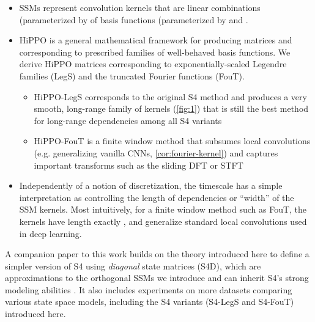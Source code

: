 \documentclass{article}
\begin{document}
\begin{itemize}\item SSMs represent convolution kernels that are linear combinations (parameterized by  of basis functions (parameterized by  and .
  \item HiPPO is a general mathematical framework for producing matrices  and  corresponding to prescribed families of well-behaved basis functions. We derive HiPPO matrices corresponding to exponentially-scaled Legendre families (LegS) and the truncated Fourier functions (FouT).
    \begin{itemize}\item HiPPO-LegS corresponds to the original S4 method and produces a very smooth, long-range family of kernels (\cref{fig:1}) that is still the best method for long-range dependencies among all S4 variants
      \item HiPPO-FouT is a finite window method that subsumes local convolutions (e.g. generalizing vanilla CNNs, \cref{cor:fourier-kernel}) and captures important transforms such as the sliding DFT or STFT
    \end{itemize}
  \item Independently of a notion of discretization, the timescale  has a simple interpretation as controlling the length of dependencies or ``width'' of the SSM kernels. Most intuitively, for a finite window method such as FouT, the kernels have length exactly , and generalize standard local convolutions used in deep learning.
\end{itemize}

A companion paper to this work builds on the theory introduced here to define a simpler version of S4 using \emph{diagonal} state matrices (S4D), which are approximations to the orthogonal SSMs we introduce and can inherit S4's strong modeling abilities \citep{gu2022s4d}.
It also includes experiments on more datasets comparing various state space models, including the S4 variants (S4-LegS and S4-FouT) introduced here.
 
\end{document}
